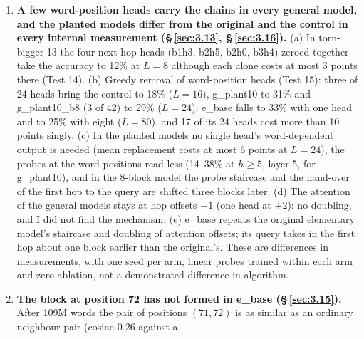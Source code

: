 \documentclass[paper=a4,fontsize=11pt,DIV=11,parskip=half,headings=small,numbers=noendperiod]{scrartcl}
\DeclareRobustCommand{\lead}[1]{\textsf{\bfseries\color{accent}#1}}
\DeclareRobustCommand{\code}[1]{{\fontseries{m}\ttfamily #1}}
\begin{document}
\begin{enumerate}
  natural words essentially never contain. The number of hops of a slot in a natural word is exactly
  Binomial(25, 0.18), so in its 205M words the control saw about 10 slots with 18 or more hops and, in
  expectation, none with 20 or more, yet it gets 97.7\% at 20. The elementary model does the same on its task:
  98.7\% at 100 hops and 92–95\% at 110 and 118, where my sample of its training data stops near 78 (Test 13).
  The original run differs from the control in several ways (205M distinct words, each seen once, against an
  8M-word file read 161 times; batch size; number of steps; schedule; seed), and I do not know which of them
  produced the original’s cliff.
\item \lead{A few word-position heads carry the chains in every general model, and the planted models differ
  from the original and the control in every internal measurement (\S\,\ref{sec:3.13}, \S\,\ref{sec:3.16}).} (a)
  In \code{torn-\allowbreak{}bigger-\allowbreak{}13} the four next-hop heads (b1h3, b2h5, b2h0, b3h4) zeroed
  together take the accuracy to 12\% at $L=8$ although each alone costs at most 3 points there (Test 14). (b)
  Greedy removal of word-position heads (Test 15): three of 24 heads bring the control to 18\% ($L=16$),
  \code{g\_\allowbreak{}plant10} to 31\% and \code{g\_\allowbreak{}plant10\_\allowbreak{}b8} (3 of 42) to 29\%
  ($L=24$); \code{e\_\allowbreak{}base} falls to 33\% with one head and to 25\% with eight ($L=80$), and 17 of
  its 24 heads cost more than 10 points singly. (c) In the planted models no single head’s word-dependent output
  is needed (mean replacement costs at most 6 points at $L=24$), the probes at the word positions read less
  (14–38\% at $h\ge5$, layer 5, for \code{g\_\allowbreak{}plant10}), and in the 8-block model the probe
  staircase and the hand-over of the first hop to the query are shifted three blocks later. (d) The attention of
  the general models stays at hop offsets $\pm1$ (one head at $+2$): no doubling, and I did not find the
  mechanism. (e) \code{e\_\allowbreak{}base} repeats the original elementary model’s staircase and doubling of
  attention offsets; its query takes in the first hop about one block earlier than the original’s. These are
  differences in measurements, with one seed per arm, linear probes trained within each arm and zero ablation,
  not a demonstrated difference in algorithm.
\item \lead{The block at position 72 has not formed in \code{e\_\allowbreak{}base} (\S\,\ref{sec:3.15}).} After
  109M words the pair of positions $(71,72)$ is as similar as an ordinary neighbour pair (cosine 0.26 against a

\end{enumerate}
\end{document}
